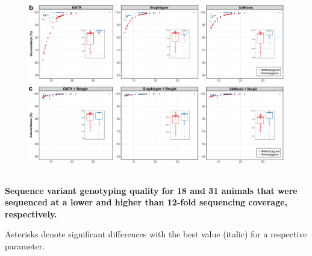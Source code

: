 \documentclass[../main.tex]{subfiles}
\begin{document}
\begin{flushleft}
\begin{landscape}
    \begin{figure}[!htb]
        \begin{center}
        \includegraphics[width=1.5\textwidth]{paper1/supplement/sp3b.pdf}
        \includegraphics[width=1.5\textwidth]{paper1/supplement/sp3c.pdf}
        \end{center}
    \end{figure}

\newpage


\subsection{}
\label{supp_mat:24}
{
    \begin{flushleft}
        \textbf{\large{Sequence variant genotyping quality for 18 and 31 animals that were sequenced at a lower and higher than 12-fold sequencing coverage, respectively.}}

        Asterisks denote significant differences with the best value (italic) for a respective parameter.
    \end{flushleft}
}


\bigskip
\bigskip
\bigskip


\end{landscape}
\end{flushleft}
\end{document}
